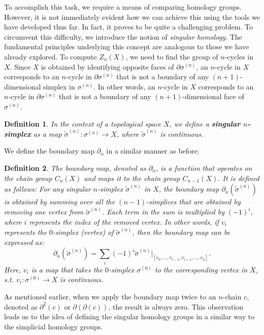 \documentclass{amsart}
\newtheorem{definition}{Definition}[section]
\begin{document}
To accomplish this task, we require a means of comparing homology groups. However, it is not immediately evident how we can achieve this using the tools we have developed thus far. In fact, it proves to be quite a challenging problem. To circumvent this difficulty, we introduce the notion of \emph{singular homology}. The fundamental principles underlying this concept are analogous to those we have already explored.
To compute $Z_n(X)$, we need to find the group of $n$-cycles in $X$. Since $X$ is obtained by identifying opposite faces of $\partial \sigma^{(n)}$, an $n$-cycle in $X$ corresponds to an $n$-cycle in $\partial \sigma^{(n)}$ that is not a boundary of any $(n+1)$-dimensional simplex in $\sigma^{(n)}$. In other words, an $n$-cycle in $X$ corresponds to an $n$-cycle in $\partial \sigma^{(n)}$ that is not a boundary of any $(n+1)$-dimensional face of $\sigma^{(n)}$.
\begin{definition}
In the context of a topological space $X$, we define a \textbf{singular $n$-simplex} as a map $\tilde{\sigma}^{(n)}: \sigma^{(n)} \rightarrow X$, where $\tilde{\sigma}^{(n)}$ is continuous.
\end{definition}

We define the boundary map $\partial_n$ in a similar manner as before:

\begin{definition}
The boundary map, denoted as $\partial_n$, is a function that operates on the chain group $C_n(X)$ and maps it to the chain group $C_{n-1}(X)$. It is defined as follows: For any singular $n$-simplex $\tilde{\sigma}^{(n)}$ in $X$, the boundary map $\partial_n(\tilde{\sigma}^{(n)})$ is obtained by summing over all the $(n-1)$-simplices that are obtained by removing one vertex from $\tilde{\sigma}^{(n)}$. Each term in the sum is multiplied by $(-1)^i$, where $i$ represents the index of the removed vertex. In other words, if $v_i$ represents the $0$-simplex (vertex) of $\tilde{\sigma}^{(n)}$, then the boundary map can be expressed as:
\begin{equation}
\partial_n(\tilde{\sigma}^{(n)}) = \sum_{i} (-1)^i \tilde{\sigma}^{(n)}\vert_{[v_0,\ldots,v_{i-1},v_{i+1},\ldots,v_n]}.
\end{equation}
Here, $v_i$ is a map that takes the $0$-simplex $\sigma^{(0)}$ to the corresponding vertex in $X$, s.t. $v_i: \sigma^{(0)} \rightarrow X$ is continuous.
\end{definition}

As mentioned earlier, when we apply the boundary map twice to an $n$-chain $c$, denoted as $\partial^2(c)$ or $\partial(\partial(c))$, the result is always zero. This observation leads us to the idea of defining the singular homology groups in a similar way to the simplicial homology groups.
\end{document}
